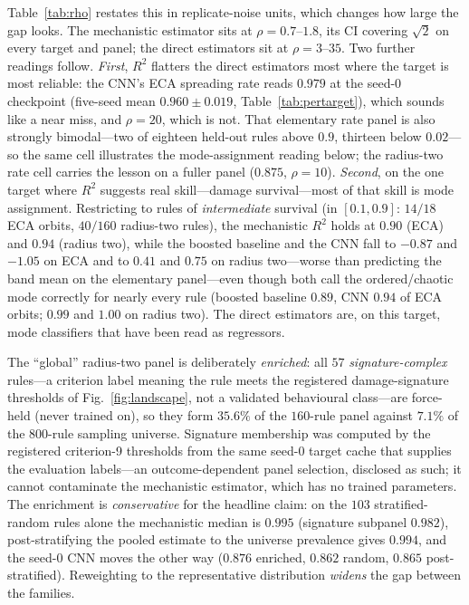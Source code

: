 \documentclass[aip,cha,amsmath,amssymb,reprint,floatfix]{revtex4-2}
\newcommand{\rtwo}{$R^2$}
\begin{document}
Table~\ref{tab:rho} restates this in replicate-noise units, which changes how
large the gap looks. The mechanistic estimator sits at
$\rho=0.7$--$1.8$, its CI covering $\sqrt2$ on every target and panel; the
direct estimators sit at $\rho=3$--$35$. Two further readings follow.
\emph{First}, \rtwo{} flatters the direct estimators most where the target is
most reliable: the CNN's ECA spreading rate reads $0.979$ at the seed-$0$
checkpoint (five-seed mean $0.960\pm0.019$, Table~\ref{tab:pertarget}),
which sounds like a
near miss, and $\rho=20$, which is not. That elementary rate panel is also
strongly bimodal---two of eighteen held-out rules above $0.9$, thirteen
below $0.02$---so the same cell illustrates the mode-assignment reading
below; the radius-two rate cell carries the lesson on a fuller panel
($0.875$, $\rho=10$). \emph{Second}, on the one target where
\rtwo{} suggests real skill---damage survival---most of that skill is mode
assignment. Restricting to rules of \emph{intermediate} survival (in
$[0.1,0.9]$: $14/18$ ECA orbits, $40/160$ radius-two rules), the mechanistic
\rtwo{} holds at $0.90$ (ECA) and $0.94$ (radius two), while the boosted
baseline and the CNN fall to $-0.87$ and $-1.05$ on ECA and to $0.41$ and
$0.75$ on radius two---worse than predicting the band mean on the elementary
panel---even though both call the ordered/chaotic mode correctly for nearly every
rule (boosted baseline $0.89$, CNN $0.94$ of ECA orbits; $0.99$ and $1.00$ on
radius two). The direct estimators are, on this target, mode classifiers that
have been read as regressors.

The ``global'' radius-two panel is deliberately \emph{enriched}: all $57$
\emph{signature-complex} rules---a criterion label meaning the rule meets
the registered damage-signature thresholds of Fig.~\ref{fig:landscape}, not
a validated behavioural class---are force-held (never trained on), so they
form $35.6\%$ of the $160$-rule panel against $7.1\%$ of the $800$-rule
sampling universe. Signature membership was computed by the registered
criterion-9 thresholds from the same seed-0 target cache that supplies the
evaluation labels---an outcome-dependent panel selection, disclosed as such;
it cannot contaminate the mechanistic estimator, which has no trained
parameters. The enrichment is \emph{conservative} for the headline claim: on
the $103$ stratified-random rules alone the mechanistic median is $0.995$
(signature subpanel $0.982$), post-stratifying the pooled estimate to the
universe prevalence gives $0.994$, and the seed-0 CNN moves the other way
($0.876$ enriched, $0.862$ random, $0.865$ post-stratified). Reweighting to
the representative distribution \emph{widens} the gap between the families.
\end{document}
